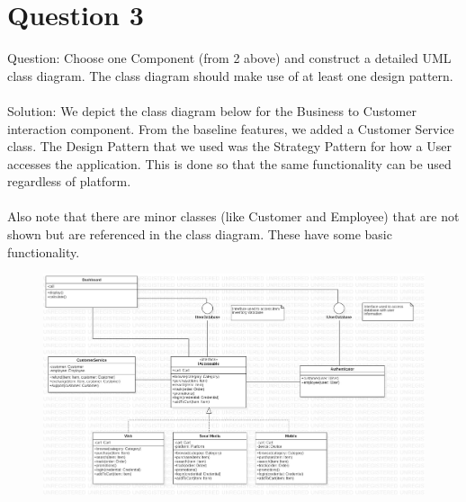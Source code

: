 \documentclass{article}
\begin{document}
\section*{Question 3}
Question: Choose one Component (from 2 above) and construct a detailed UML class diagram. The class diagram should make use of at least one design pattern. \\\\
Solution: We depict the class diagram below for the Business to Customer interaction component. From the baseline features, we added a Customer Service class. The Design Pattern that we used was the Strategy Pattern for how a User accesses the application. This is done so that the same functionality can be used regardless of platform. \\\\
Also note that there are minor classes (like Customer and Employee) that are not shown but are referenced in the class diagram. These have some basic functionality.
\begin{figure}[h]
	\includegraphics[width=6.5in]{Main.jpg}
\end{figure}

\newpage
\end{document}
